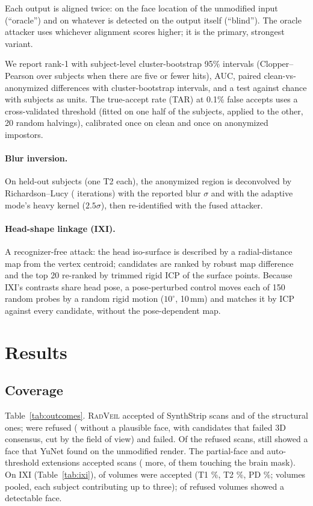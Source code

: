 \documentclass[11pt]{article}
\newcommand{\rv}{\textsc{RadVeil}}
\begin{document}
Each output is aligned twice: on the face location of the unmodified input
(``oracle'') and on whatever is detected on the output itself (``blind'').
The oracle attacker uses whichever alignment scores higher; it is the
primary, strongest variant.

We report rank-1 with subject-level cluster-bootstrap 95\% intervals
(Clopper--Pearson over subjects when there are five or fewer hits), AUC,
paired clean-vs-anonymized differences with cluster-bootstrap intervals, and
a test against chance with subjects as units. The true-accept rate (TAR) at
0.1\% false accepts uses a cross-validated threshold (fitted on one half of
the subjects, applied to the other, 20 random halvings), calibrated once on
clean and once on anonymized impostors.
\paragraph{Blur inversion.} On \deconvN{} held-out subjects (one T2 each), the
anonymized region is deconvolved by Richardson--Lucy (\deconvIters{}
iterations) with the reported blur $\sigma$ and with the adaptive mode's
heavy kernel ($2.5\sigma$), then re-identified with the fused attacker.
\paragraph{Head-shape linkage (IXI).} A recognizer-free attack: the head
iso-surface is described by a radial-distance map from the vertex centroid;
candidates are ranked by robust map difference and the top 20 re-ranked by
trimmed rigid ICP of the surface points. Because IXI's contrasts share head
pose, a pose-perturbed control moves each of 150 random probes by a random
rigid motion ($10^\circ$, 10\,mm) and matches it by ICP against every
candidate, without the pose-dependent map.

\section{Results}
\label{sec:results}

\subsection{Coverage}
Table~\ref{tab:outcomes}. \rv{} accepted \ssAccepted{} of \ssCases{}
SynthStrip scans and \ssStructAccepted{} of the \ssStructCases{} structural
ones; \ssRefused{} were refused (\ssRefusedNoFace{} without a plausible face,
\ssRefusedRejected{} with candidates that failed 3D consensus,
\ssRefusedFov{} cut by the field of view) and \ssErrors{} failed. Of the
refused scans,  still showed a face that YuNet found
on the unmodified render. The partial-face and auto-threshold extensions
accepted \robustAccepted{} scans (\robustGained{} more, \robustGainedTouched{}
of them touching the brain mask). On IXI (Table~\ref{tab:ixi}), \ixiAccepted{}
of \ixiVolumes{} volumes were accepted (T1 \ixiAccTOnePct\%, T2
\ixiAccTTwoPct\%, PD \ixiAccPdPct\%; volumes pooled, each subject
contributing up to three);  of  refused
volumes showed a detectable face.
\end{document}
